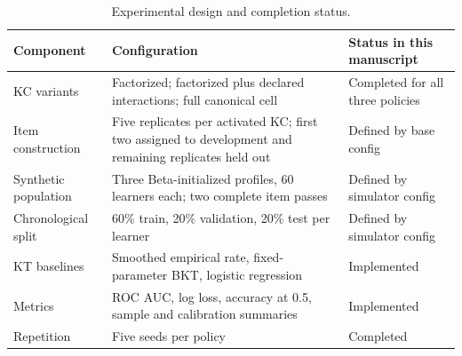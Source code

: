 \begin{table}[t]
  \centering
  \small
  \begin{tabularx}{\textwidth}{@{}lXl@{}}
    \toprule
    Component & Configuration & Status in this manuscript \\
    \midrule
    KC variants & Factorized; factorized plus declared interactions; full
      canonical cell & Completed for all three policies \\
    Item construction & Five replicates per activated KC; first two assigned
      to development and remaining replicates held out & Defined by base config \\
    Synthetic population & Three Beta-initialized profiles, 60 learners each;
      two complete item passes & Defined by simulator config \\
    Chronological split & 60\% train, 20\% validation, 20\% test per learner &
      Defined by simulator config \\
    KT baselines & Smoothed empirical rate, fixed-parameter BKT, logistic
      regression & Implemented \\
    Metrics & ROC AUC, log loss, accuracy at 0.5, sample and calibration
      summaries & Implemented \\
    Repetition & Five seeds per policy & Completed \\
    \bottomrule
  \end{tabularx}
  \caption{Experimental design and completion status.}
  \label{tab:experimental-setup}
\end{table}
